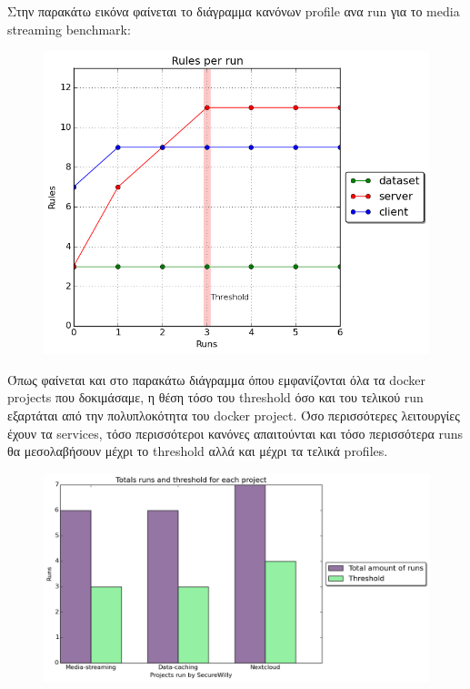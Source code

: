 Στην παρακάτω εικόνα φαίνεται το διάγραμμα κανόνων \en profile\gr{} ανα \en run\gr{} για το \en media streaming benchmark\gr{}:

\begin{figure}[H]
  \centering
   \includegraphics[width=0.75\linewidth]{figures/mediastreaming/rulesthreshold.png}
\end{figure}

Όπως φαίνεται και στο παρακάτω διάγραμμα όπου εμφανίζονται όλα τα \en docker projects\gr{} που δοκιμάσαμε, η θέση τόσο του \en threshold\gr{} όσο και του τελικού \en run\gr{} εξαρτάται από την πολυπλοκότητα του \en docker project\gr{}. Όσο περισσότερες λειτουργίες έχουν τα \en services\gr{}, τόσο περισσότεροι κανόνες απαιτούνται και τόσο περισσότερα \en runs\gr{} θα μεσολαβήσουν μέχρι το \en threshold\gr{} αλλά και μέχρι τα τελικά \en profiles\gr{}. 
\begin{figure}[H]
  \centering
   \includegraphics[width=0.85\linewidth]{figures/compare.png}
\end{figure}

